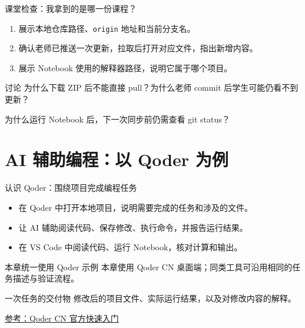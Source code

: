 \documentclass[9pt]{ctexbeamer}
\begin{document}
\begin{frame}{课堂检查：我拿到的是哪一份课程？}
  \begin{enumerate}
    \item 展示本地仓库路径、\texttt{origin} 地址和当前分支名。
    \item 确认老师已推送一次更新，拉取后打开对应文件，指出新增内容。
    \item 展示 Notebook 使用的解释器路径，说明它属于哪个项目。
  \end{enumerate}
  \begin{block}{讨论}
    为什么下载 ZIP 后不能直接 pull？为什么老师 commit 后学生可能仍看不到更新？\par
    为什么运行 Notebook 后，下一次同步前仍需查看 git status？
  \end{block}
\end{frame}


\section{AI 辅助编程：以 Qoder 为例}

\begin{frame}{认识 Qoder：围绕项目完成编程任务}
  \begin{itemize}
    \item 在 Qoder 中打开本地项目，说明需要完成的任务和涉及的文件。
    \item 让 AI 辅助阅读代码、保存修改、执行命令，并报告运行结果。
    \item 在 VS Code 中阅读代码、运行 Notebook，核对计算和输出。
  \end{itemize}
  \begin{block}{本章统一使用 Qoder 示例}
    本章使用 Qoder CN 桌面端；同类工具可沿用相同的任务描述与验证流程。
  \end{block}
  \begin{block}{一次任务的交付物}
    修改后的项目文件、实际运行结果，以及对修改内容的解释。
  \end{block}
  {\tiny\href{https://docs.qoder.cn/qoder/quickstart}{参考：Qoder CN 官方快速入门}}
\end{frame}
\end{document}
